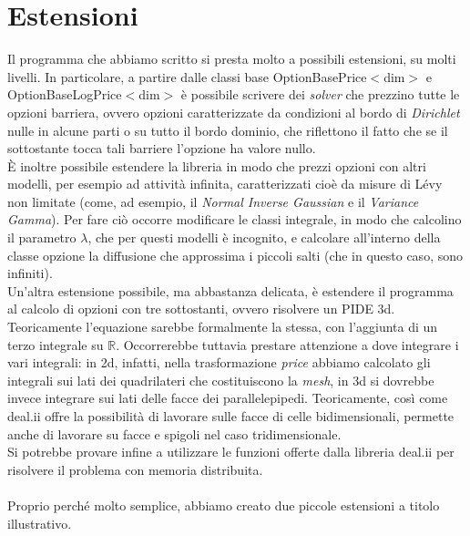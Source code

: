 \documentclass[a4paper,10pt]{report}
\theoremstyle{plain}
\theoremstyle{definition}
\theoremstyle{remark}
\begin{document}
\chapter{Estensioni}
Il programma che abbiamo scritto si presta molto a possibili estensioni, su molti livelli. In particolare, a partire dalle classi base \textsf{OptionBasePrice$<$dim$>$} e \textsf{OptionBaseLogPrice$<$dim$>$} \`e possibile scrivere dei \emph{solver} che prezzino tutte le opzioni barriera, ovvero opzioni caratterizzate da condizioni al bordo di \emph{Dirichlet} nulle in alcune parti o su tutto il bordo dominio, che riflettono il fatto che se il sottostante tocca tali barriere l'opzione ha valore nullo.\\\`E inoltre possibile estendere la libreria in modo che prezzi opzioni con altri modelli, per esempio ad attivit\`a infinita, caratterizzati cio\`e da misure di L\'evy non limitate (come, ad esempio, il \emph{Normal Inverse Gaussian} e il \emph{Variance Gamma}). Per fare ci\`o occorre modificare le classi integrale, in modo che calcolino il parametro $\lambda$, che per questi modelli \`e incognito, e calcolare all'interno della classe opzione la diffusione che approssima i piccoli salti (che in questo caso, sono infiniti).\\Un'altra estensione possibile, ma abbastanza delicata, \`e estendere il programma al calcolo di opzioni con tre sottostanti, ovvero risolvere un PIDE 3d. Teoricamente l'equazione sarebbe formalmente la stessa, con l'aggiunta di un terzo integrale su $\mathbb{R}$. Occorrerebbe tuttavia prestare attenzione a dove integrare i vari integrali: in 2d, infatti, nella trasformazione \emph{price} abbiamo calcolato gli integrali sui lati dei quadrilateri che costituiscono la \emph{mesh}, in 3d si dovrebbe invece integrare sui lati delle facce dei parallelepipedi. Teoricamente, cos\`i come \textsf{deal.ii} offre la possibilità di lavorare sulle facce di celle bidimensionali, permette anche di lavorare su facce e spigoli nel caso tridimensionale. \\Si potrebbe provare infine a utilizzare le funzioni offerte dalla libreria \textsf{deal.ii} per risolvere il problema con memoria distribuita.\\\\
Proprio perché molto semplice, abbiamo creato due piccole estensioni a titolo illustrativo.
\end{document}
